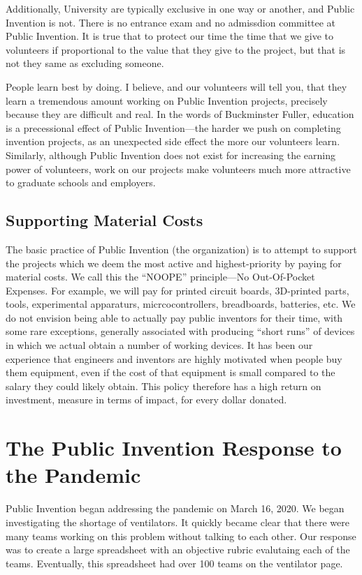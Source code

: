 \documentclass[
	fontsize=10pt, %
	twoside=false, %
	secnumdepth=1, %
]{kaobook}
\begin{document}
Additionally, University are typically exclusive in one way
or another, and Public Invention is not.
There is no entrance exam and no admissdion committee at Public Invention.
It is true that to protect our time the time that we give
to volunteers if proportional to the value that they give to the project,
but that is not they same as excluding someone.

People learn best by doing. I believe, and our volunteers
will tell you, that they learn a tremendous amount working
on Public Invention projects, precisely because they are difficult and real.
In the words of Buckminster Fuller, education is a precessional effect
of Public Invention---the harder we push on completing invention projects,
as an unexpected side effect the more our volunteers learn.
Similarly, although Public Invention does not exist for increasing the
earning power of volunteers, work on our projects make volunteers much more
attractive to graduate schools and employers.

\section{Supporting Material Costs}
\label{chp:material}

The basic practice of Public Invention (the organization) is to attempt to
support the projects which we deem the most active and highest-priority
by paying for material costs.
We call this the ``NOOPE'' principle---No Out-Of-Pocket Expenses.
For example, we will pay for printed circuit boards, 3D-printed parts, tools,
experimental apparaturs, micrcocontrollers, breadboards, batteries, etc.
We do not envision being able to actually pay public inventors for their
time, with some rare exceptions, generally associated with producing
``short runs'' of devices in which we actual obtain a number of working devices.
It has been our experience that engineers and inventors are highly motivated when people
buy them equipment, even if the cost of that equipment is small compared to the
salary they could likely obtain.
This policy therefore has a high return on investment, measure in terms of impact,
for every dollar donated.

\chapter{The Public Invention Response to the Pandemic}

Public Invention began addressing the pandemic on March 16, 2020.
We began investigating the shortage of ventilators.
It quickly became clear that there were many teams working on this
problem without talking to each other.
Our response was to create a large spreadsheet with an objective
rubric evalutaing each of the teams.
Eventually, this spreadsheet had over 100 teams on the ventilator
page.
\end{document}
